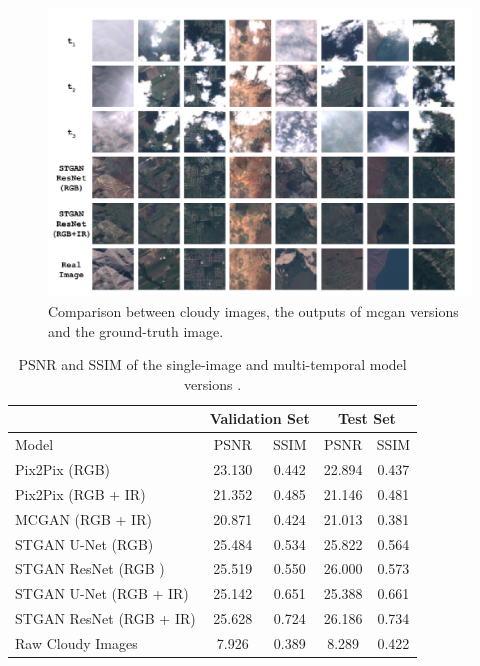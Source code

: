 \documentclass[11pt, a4paper]{article}
\begin{document}
	\begin{figure}[H]
		\captionsetup{justification=centering}
		\centering
		\includegraphics[width=14cm]{imgs/relatedwork/conditional-multi-temporal.png}
		\caption{Comparison between cloudy images, the outputs of \gls{mcgan} versions and the ground-truth image.}
		\label{fig:related-cond-multi}
	\end{figure}
	{
	\renewcommand{\arraystretch}{1.5}%
	\begin{table}[H]
		\caption{PSNR and SSIM of the single-image and multi-temporal model versions .}
		\centering
		\begin{tabular}{l|cccc}
			&\multicolumn{2}{c}{Validation Set}&\multicolumn{2}{c}{Test Set}\\
			\hline\hline
			Model & PSNR & SSIM & PSNR & SSIM\\\hline
			Pix2Pix (RGB) & 23.130 & 0.442 & 22.894 & 0.437\\
			Pix2Pix (RGB + IR)& 21.352 & 0.485& 21.146& 0.481\\
			MCGAN (RGB + IR) & 20.871  & 0.424 & 21.013  & 0.381\\\hline
			STGAN U-Net (RGB) & 25.484 & 0.534 & 25.822 & 0.564\\
			STGAN ResNet (RGB )& 25.519 &  0.550 & 26.000 &  0.573\\
			STGAN U-Net (RGB + IR) & 25.142 & 0.651 & 25.388 &  0.661 \\
			STGAN ResNet (RGB + IR) & 25.628 & 0.724 & 26.186 & 0.734\\\hline
			Raw Cloudy Images & 7.926 & 0.389 & 8.289 & 0.422
		\end{tabular}
	\end{table}
	}
\end{document}
